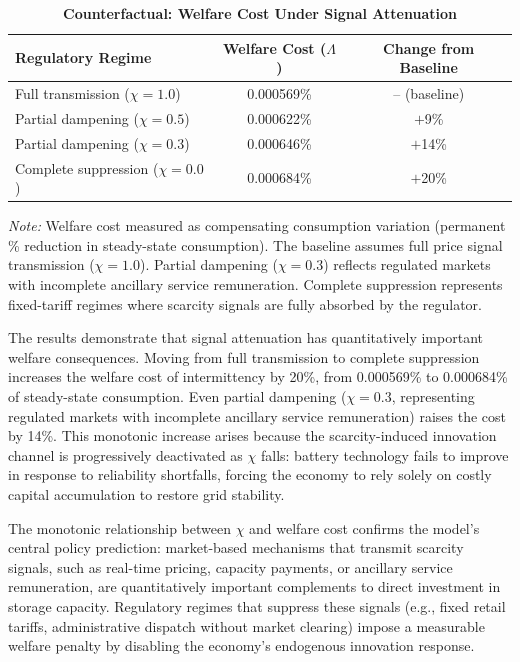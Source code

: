 \documentclass[12pt, a4paper]{article}
\begin{document}
	\begin{table}[H]
		\centering
		\caption{\textbf{Counterfactual: Welfare Cost Under Signal Attenuation}}
		\label{tab:counterfactual}
		\renewcommand{\arraystretch}{1.3}
		\begin{tabular}{l c c}
			\toprule
			\textbf{Regulatory Regime} & \textbf{Welfare Cost ($\Lambda$)} & \textbf{Change from Baseline} \\
			\midrule
			Full transmission ($\chi = 1.0$) & 0.000569\% & -- (baseline) \\
			Partial dampening ($\chi = 0.5$) & 0.000622\% & $+$9\% \\
			Partial dampening ($\chi = 0.3$) & 0.000646\% & $+$14\% \\
			Complete suppression ($\chi = 0.0$) & 0.000684\% & $+$20\% \\
			\bottomrule
		\end{tabular}
		\vspace{0.2cm}
		\parbox{\textwidth}{\footnotesize \textit{Note:} Welfare cost measured as compensating consumption variation (permanent \% reduction in steady-state consumption). The baseline assumes full price signal transmission ($\chi = 1.0$). Partial dampening ($\chi = 0.3$) reflects regulated markets with incomplete ancillary service remuneration. Complete suppression represents fixed-tariff regimes where scarcity signals are fully absorbed by the regulator.}
	\end{table}

	The results demonstrate that signal attenuation has quantitatively important welfare consequences. Moving from full transmission to complete suppression increases the welfare cost of intermittency by 20\%, from 0.000569\% to 0.000684\% of steady-state consumption. Even partial dampening ($\chi = 0.3$, representing regulated markets with incomplete ancillary service remuneration) raises the cost by 14\%. This monotonic increase arises because the scarcity-induced innovation channel is progressively deactivated as $\chi$ falls: battery technology fails to improve in response to reliability shortfalls, forcing the economy to rely solely on costly capital accumulation to restore grid stability.

	The monotonic relationship between $\chi$ and welfare cost confirms the model's central policy prediction: market-based mechanisms that transmit scarcity signals, such as real-time pricing, capacity payments, or ancillary service remuneration, are quantitatively important complements to direct investment in storage capacity. Regulatory regimes that suppress these signals (e.g., fixed retail tariffs, administrative dispatch without market clearing) impose a measurable welfare penalty by disabling the economy's endogenous innovation response.
\end{document}
